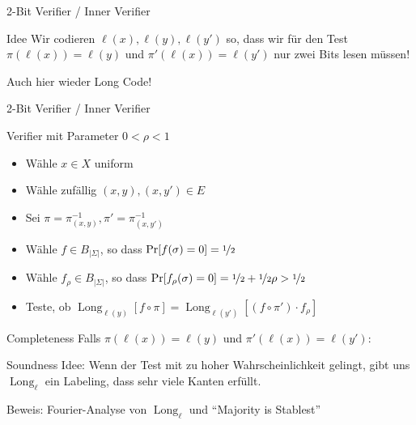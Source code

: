 \documentclass[table,german,10pt]{beamer}
\DeclareMathOperator{\longc}{Long}
\begin{document}
\begin{frame}{2-Bit Verifier / Inner Verifier}
  \begin{block}{Idee}
    Wir codieren  $\ell(x),\ell(y),\ell(y')$ so, dass wir für den Test
    $\pi(\ell(x))=\ell(y)$ und $\pi'(\ell(x))=\ell(y')$ nur zwei Bits
    lesen müssen!
  \end{block}
  \pause

  Auch hier wieder Long Code!
\end{frame}
\begin{frame}{2-Bit Verifier / Inner Verifier}
\begin{block}{Verifier mit Parameter $0<\rho<1$}
  \begin{itemize}[<+->]
\item Wähle $x\in X$ uniform
\item Wähle zufällig $(x,y),(x,y')\in E$
\item Sei $\pi=\pi_{(x,y)}^{-1},\pi'=\pi_{(x,y')}^{-1}$
  \item Wähle $f\in B_{|\Sigma|}$, so dass $\Pr[f(\sigma)=0]=\nicefrac{1}{2}$
  \item Wähle $f_{\rho}\in B_{|\Sigma|}$, so dass $\Pr[f_{\rho}(\sigma)=0]=\nicefrac{1}{2}+\nicefrac{1}{2}\rho>\nicefrac{1}{2}$
  \item Teste, ob $\longc_{\ell(y)}[f\circ
    \pi]=\longc_{\ell(y')}[(f\circ \pi')\cdot f_{\rho}]$
  \end{itemize}
  
\end{block}
\pause
\begin{block}{Completeness}
  Falls $\pi(\ell(x))=\ell(y)$ und $\pi'(\ell(x))=\ell(y')$:
\end{block}
\pause
\begin{block}{Soundness}
Idee: Wenn der Test mit zu hoher Wahrscheinlichkeit gelingt, gibt uns
$\longc_{\ell}$ ein Labeling, dass sehr viele Kanten erfüllt. 

Beweis: Fourier-Analyse von $\longc_{\ell}$ und ``Majority is Stablest''
  
\end{block}
  
\end{frame}
\end{document}
